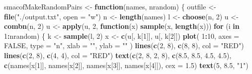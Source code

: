 \documentclass[
  12pt,
]{article}
\newenvironment{Shaded}{\begin{snugshade}}{\end{snugshade}}
\newcommand{\AttributeTok}[1]{\textcolor[rgb]{0.13,0.29,0.53}{#1}}
\newcommand{\ConstantTok}[1]{\textcolor[rgb]{0.56,0.35,0.01}{#1}}
\newcommand{\ControlFlowTok}[1]{\textcolor[rgb]{0.13,0.29,0.53}{\textbf{#1}}}
\newcommand{\DecValTok}[1]{\textcolor[rgb]{0.00,0.00,0.81}{#1}}
\newcommand{\FloatTok}[1]{\textcolor[rgb]{0.00,0.00,0.81}{#1}}
\newcommand{\FunctionTok}[1]{\textcolor[rgb]{0.13,0.29,0.53}{\textbf{#1}}}
\newcommand{\NormalTok}[1]{#1}
\newcommand{\OtherTok}[1]{\textcolor[rgb]{0.56,0.35,0.01}{#1}}
\newcommand{\SpecialCharTok}[1]{\textcolor[rgb]{0.81,0.36,0.00}{\textbf{#1}}}
\newcommand{\StringTok}[1]{\textcolor[rgb]{0.31,0.60,0.02}{#1}}
\begin{document}
\begin{Shaded}
\begin{Highlighting}[]
\NormalTok{smacofMakeRandomPairs }\OtherTok{\textless{}{-}} \ControlFlowTok{function}\NormalTok{(names, nrandom) \{}
\NormalTok{  outfile }\OtherTok{\textless{}{-}} \FunctionTok{file}\NormalTok{(}\StringTok{"./output.txt"}\NormalTok{, }\AttributeTok{open =} \StringTok{"w"}\NormalTok{)}
\NormalTok{  n }\OtherTok{\textless{}{-}} \FunctionTok{length}\NormalTok{(names)}
\NormalTok{  l }\OtherTok{\textless{}{-}} \FunctionTok{choose}\NormalTok{(n, }\DecValTok{2}\NormalTok{)}
\NormalTok{  u }\OtherTok{\textless{}{-}} \FunctionTok{combn}\NormalTok{(n, }\DecValTok{2}\NormalTok{)}
\NormalTok{  u }\OtherTok{\textless{}{-}} \FunctionTok{apply}\NormalTok{(u, }\DecValTok{2}\NormalTok{, }\ControlFlowTok{function}\NormalTok{(x)}
    \FunctionTok{sample}\NormalTok{(x, }\FunctionTok{length}\NormalTok{(x)))}
  \ControlFlowTok{for}\NormalTok{ (i }\ControlFlowTok{in} \DecValTok{1}\SpecialCharTok{:}\NormalTok{nrandom) \{}
\NormalTok{    k }\OtherTok{\textless{}{-}} \FunctionTok{sample}\NormalTok{(l, }\DecValTok{2}\NormalTok{)}
\NormalTok{    x }\OtherTok{\textless{}{-}} \FunctionTok{c}\NormalTok{(u[, k[}\DecValTok{1}\NormalTok{]], u[, k[}\DecValTok{2}\NormalTok{]])}
    \FunctionTok{plot}\NormalTok{(}
      \DecValTok{1}\SpecialCharTok{:}\DecValTok{10}\NormalTok{,}
      \AttributeTok{axes =} \ConstantTok{FALSE}\NormalTok{,}
      \AttributeTok{type =} \StringTok{"n"}\NormalTok{,}
      \AttributeTok{xlab =} \StringTok{""}\NormalTok{,}
      \AttributeTok{ylab =} \StringTok{""}
\NormalTok{    )}
    \FunctionTok{lines}\NormalTok{(}\FunctionTok{c}\NormalTok{(}\DecValTok{2}\NormalTok{, }\DecValTok{8}\NormalTok{), }\FunctionTok{c}\NormalTok{(}\DecValTok{8}\NormalTok{, }\DecValTok{8}\NormalTok{), }\AttributeTok{col =} \StringTok{"RED"}\NormalTok{)}
    \FunctionTok{lines}\NormalTok{(}\FunctionTok{c}\NormalTok{(}\DecValTok{2}\NormalTok{, }\DecValTok{8}\NormalTok{), }\FunctionTok{c}\NormalTok{(}\DecValTok{4}\NormalTok{, }\DecValTok{4}\NormalTok{), }\AttributeTok{col =} \StringTok{"RED"}\NormalTok{)}
    \FunctionTok{text}\NormalTok{(}\FunctionTok{c}\NormalTok{(}\DecValTok{2}\NormalTok{, }\DecValTok{8}\NormalTok{, }\DecValTok{2}\NormalTok{, }\DecValTok{8}\NormalTok{),}
         \FunctionTok{c}\NormalTok{(}\FloatTok{8.5}\NormalTok{, }\FloatTok{8.5}\NormalTok{, }\FloatTok{4.5}\NormalTok{, }\FloatTok{4.5}\NormalTok{),}
         \FunctionTok{c}\NormalTok{(names[x[}\DecValTok{1}\NormalTok{]], names[x[}\DecValTok{2}\NormalTok{]], names[x[}\DecValTok{3}\NormalTok{]], names[x[}\DecValTok{4}\NormalTok{]]),}
         \AttributeTok{cex =} \FloatTok{1.5}\NormalTok{)}
    \FunctionTok{text}\NormalTok{(}\DecValTok{5}\NormalTok{, }\FloatTok{8.5}\NormalTok{, }\StringTok{"1"}\NormalTok{)}

\end{Highlighting}
\end{Shaded}
\end{document}
